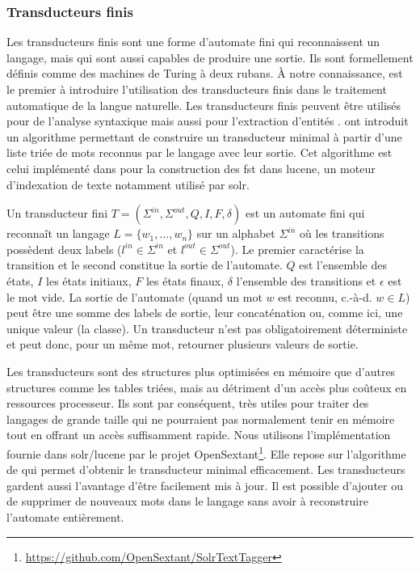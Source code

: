\subsubsection{Transducteurs finis}

Les transducteurs finis sont une forme d'automate fini qui reconnaissent un langage, mais qui sont aussi capables de produire une sortie.
Ils sont formellement définis comme des machines de Turing à deux rubans.
À notre connaissance, \cite{grossUseFiniteAutomata1989} est le premier à introduire l'utilisation des transducteurs finis dans le traitement automatique de la langue naturelle.
Les transducteurs finis peuvent être utilisés pour de l'analyse syntaxique \cite{briscoeRobustAccurateStatistical2002} mais aussi pour l'extraction d'entités \cite{gaioExtendedNamedEntity2017}.
\cite{mihovDirectConstructionMinimal2001} ont introduit un algorithme permettant de construire un transducteur minimal à partir d'une liste triée de mots reconnus par le langage avec leur sortie.
Cet algorithme est celui implémenté dans pour la construction des \gls{fst} dans \gls{lucene}, un moteur d'indexation de texte notamment utilisé par \gls{solr}.

\begin{definition}[FST]
    Un transducteur fini $T = (\Sigma^{in}, \Sigma^{out}, Q, I, F, \delta)$ est un automate fini qui reconnaît un langage $L = \{w_1, \dots, w_n\}$ sur un alphabet $\Sigma^{in}$ où les transitions possèdent deux labels ($l^{in} \in \Sigma^{in}$ et $l^{out} \in \Sigma^{out}$).
    Le premier caractérise la transition et le second constitue la sortie de l'automate.
    $Q$ est l'ensemble des états, $I$ les états initiaux, $F$ les états finaux, $\delta$ l'ensemble des transitions et $\epsilon$ est le mot vide.
    La sortie de l'automate (quand un mot $w$ est reconnu, c.-à-d. $w \in L$) peut être une somme des labels de sortie, leur concaténation ou, comme ici, une unique valeur (la classe).
    Un transducteur n'est pas obligatoirement déterministe et peut donc, pour un même mot, retourner plusieurs valeurs de sortie.
\end{definition}

Les transducteurs sont des structures plus optimisées en mémoire que d'autres structures comme les tables triées, mais au détriment d'un accès plus coûteux en ressources processeur.
Ils sont par conséquent, très utiles pour traiter des langages de grande taille qui ne pourraient pas normalement tenir en mémoire tout en offrant un accès suffisamment rapide.
Nous utilisons l'implémentation fournie dans \gls{solr}/\gls{lucene} par le projet OpenSextant\footnote{\url{https://github.com/OpenSextant/SolrTextTagger}}.
Elle repose sur l'algorithme de \cite{mihovDirectConstructionMinimal2001} qui permet d'obtenir le transducteur minimal efficacement.
Les transducteurs gardent aussi l'avantage d'être facilement mis à jour.
Il est possible d'ajouter ou de supprimer de nouveaux mots dans le langage sans avoir à reconstruire l'automate entièrement.

